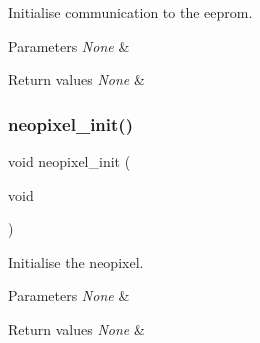 Initialise communication to the eeprom. 


\begin{DoxyParams}{Parameters}
{\em None} & \\
\hline
\end{DoxyParams}

\begin{DoxyRetVals}{Return values}
{\em None} & \\
\hline
\end{DoxyRetVals}
\mbox{\label{group___initialisation_gaac78468985e44a3e4d353ea9276b33bc}} 
\subsubsection{\texorpdfstring{neopixel\+\_\+init()}{neopixel\_init()}}
{\footnotesize\ttfamily void neopixel\+\_\+init (\begin{DoxyParamCaption}\item[{void}]{ }\end{DoxyParamCaption})}



Initialise the neopixel. 


\begin{DoxyParams}{Parameters}
{\em None} & \\
\hline
\end{DoxyParams}

\begin{DoxyRetVals}{Return values}
{\em None} & \\
\hline
\end{DoxyRetVals}
